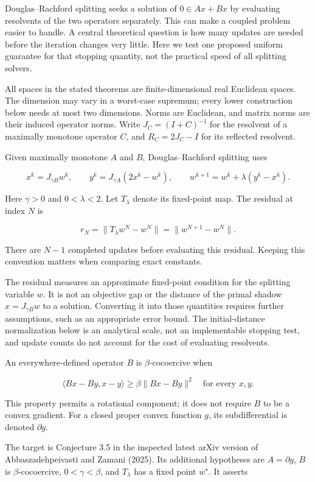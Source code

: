\documentclass[
  british,
  11pt,
  a4paper,
]{article}
\begin{document}
Douglas--Rachford splitting seeks a solution of \(0\in Ax+Bx\) by
evaluating resolvents of the two operators separately. This can make a
coupled problem easier to handle. A central theoretical question is how
many updates are needed before the iteration changes very little. Here
we test one proposed uniform guarantee for that stopping quantity, not
the practical speed of all splitting solvers.

All spaces in the stated theorems are finite-dimensional real Euclidean
spaces. The dimension may vary in a worst-case supremum; every lower
construction below needs at most two dimensions. Norms are Euclidean,
and matrix norms are their induced operator norms. Write
\(J_C=(I+C)^{-1}\) for the resolvent of a maximally monotone operator
\(C\), and \(R_C=2J_C-I\) for its reflected resolvent.

Given maximally monotone \(A\) and \(B\), Douglas--Rachford splitting
uses

\[
x^k=J_{\gamma B}w^k,\qquad
y^k=J_{\gamma A}(2x^k-w^k),\qquad
w^{k+1}=w^k+\lambda(y^k-x^k).
\tag{1}
\]

Here \(\gamma>0\) and \(0<\lambda<2\). Let \(T_\lambda\) denote its
fixed-point map. The residual at index \(N\) is

\[r_N=\|T_\lambda w^N-w^N\|=\|w^{N+1}-w^N\|.\]

There are \(N-1\) completed updates before evaluating this residual.
Keeping this convention matters when comparing exact constants.

The residual measures an approximate fixed-point condition for the
splitting variable \(w\). It is not an objective gap or the distance of
the primal shadow \(x=J_{\gamma B}w\) to a solution. Converting it into
those quantities requires further assumptions, such as an appropriate
error bound. The initial-distance normalization below is an analytical
scale, not an implementable stopping test, and update counts do not
account for the cost of evaluating resolvents.

An everywhere-defined operator \(B\) is \(\beta\)-cocoercive when

\[
\langle Bx-By,x-y\rangle\geq\beta\|Bx-By\|^2
\quad\text{for every }x,y.
\tag{2}
\]

This property permits a rotational component; it does not require \(B\)
to be a convex gradient. For a closed proper convex function \(g\), its
subdifferential is denoted \(\partial g\).

The target is Conjecture 3.5 in the inspected latest arXiv version of
Abbaszadehpeivasti and Zamani (2025). Its additional hypotheses are
\(A=\partial g\), \(B\) is \(\beta\)-cocoercive, \(0<\gamma<\beta\), and
\(T_\lambda\) has a fixed point \(w^\star\). It asserts
\end{document}
